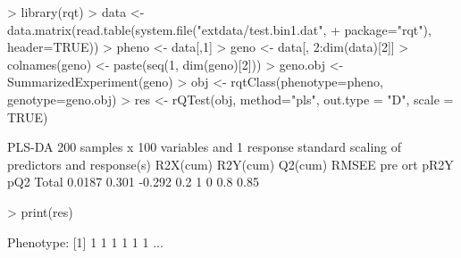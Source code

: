 \documentclass{article}
\begin{document}
\begin{Schunk}
\begin{Sinput}
> library(rqt)
> data <- data.matrix(read.table(system.file("extdata/test.bin1.dat",
+                                            package="rqt"), header=TRUE))
> pheno <- data[,1]
> geno <- data[, 2:dim(data)[2]]
> colnames(geno) <- paste(seq(1, dim(geno)[2]))
> geno.obj <- SummarizedExperiment(geno)
> obj <- rqtClass(phenotype=pheno, genotype=geno.obj)
> res <- rQTest(obj, method="pls", out.type = "D", scale = TRUE)
\end{Sinput}
\begin{Soutput}
PLS-DA
200 samples x 100 variables and 1 response
standard scaling of predictors and response(s)
      R2X(cum) R2Y(cum) Q2(cum) RMSEE pre ort pR2Y  pQ2
Total   0.0187    0.301  -0.292   0.2   1   0  0.8 0.85
\end{Soutput}
\begin{Sinput}
> print(res)
\end{Sinput}
\begin{Soutput}
Phenotype:
[1] 1 1 1 1 1 1
...


\end{Soutput}
\end{Schunk}
\end{document}
